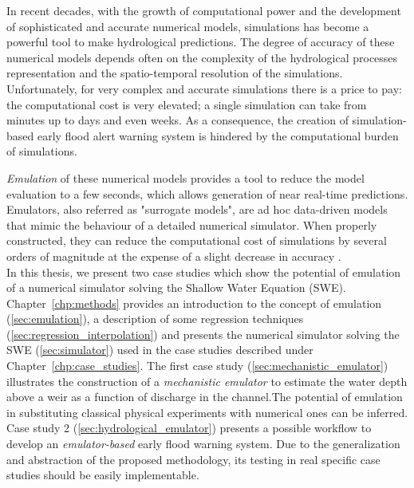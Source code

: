 In recent decades, with the growth of computational power and the development of sophisticated and accurate numerical models, simulations has become a powerful tool to make hydrological predictions. 
The degree of accuracy of these numerical models depends often on the complexity of the hydrological processes representation and the spatio-temporal resolution of the simulations. Unfortunately, for very complex and accurate simulations there is a price to pay: the computational cost is very elevated; a single simulation can take from  minutes up to days and even weeks. As a consequence, the creation of simulation-based early flood alert warning system is hindered by the computational burden of simulations. 

\emph{Emulation} of these numerical models provides a tool to reduce the model evaluation to a few seconds, which allows generation of near real-time predictions.
Emulators, also referred as "surrogate models", are ad hoc data-driven models that mimic the behaviour of a detailed numerical simulator. When properly constructed, they can reduce the computational cost of simulations by several orders of magnitude at the expense of a slight decrease in accuracy \autocite{carbajal_appraisal_2016}.\\

In this thesis, we present two case studies which show the potential of emulation of a numerical simulator solving the Shallow Water Equation (SWE). 
Chapter~\ref{chp:methods} provides an introduction to the concept of emulation (\ref{sec:emulation}), a description of some regression techniques (\ref{sec:regression_interpolation}) and presents the numerical simulator solving the SWE (\ref{sec:simulator}) used in the case studies described under Chapter~\ref{chp:case_studies}.
The first case study (\ref{sec:mechanistic_emulator}) illustrates the construction of a \emph{mechanistic emulator} to estimate the water depth above a weir as a function of discharge in the channel.The potential of emulation in substituting classical physical experiments with numerical ones can be inferred.
Case study 2 (\ref{sec:hydrological_emulator}) presents a possible workflow to develop an \emph{emulator-based} early flood warning system. 
Due to the generalization and abstraction of the proposed methodology, its testing in real specific case studies should be easily implementable.\\




